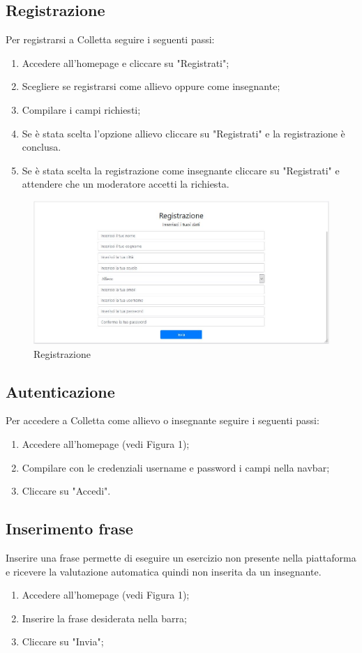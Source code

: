 \documentclass[11pt,a4paper]{article}
\begin{document}
{	\subsection{Registrazione}
	Per registrarsi a Colletta seguire i seguenti passi:
	\begin{enumerate}
	\item Accedere all'homepage e cliccare su "Registrati";
	\item Scegliere se registrarsi come allievo oppure come insegnante;
	\item Compilare i campi richiesti;
	\item Se è stata scelta l'opzione allievo cliccare su "Registrati" e la registrazione è conclusa.
	\item Se è stata scelta la registrazione come insegnante cliccare su "Registrati" e attendere che un moderatore accetti la richiesta.
	\end{enumerate}

	\begin{figure}[h]
		\centering
		\includegraphics[scale=0.65]{images/registrazione.jpg}
		\caption{Registrazione}
	\end{figure}
	\newpage

	\subsection{Autenticazione}
	Per accedere a Colletta come allievo o insegnante seguire i seguenti passi:
	\begin{enumerate}
		\item Accedere all'homepage (vedi Figura 1);
		\item Compilare con le credenziali username e password i campi nella navbar;
		\item Cliccare su "Accedi".
	\end{enumerate}

	\subsection{Inserimento frase}
	Inserire una frase permette di eseguire un esercizio non presente nella piattaforma e ricevere la valutazione automatica quindi non inserita da un insegnante.	
	\begin{enumerate}
		\item Accedere all'homepage (vedi Figura 1);
		\item Inserire la frase desiderata nella barra;
		\item Cliccare su "Invia";
	\end{enumerate}

}
\end{document}
